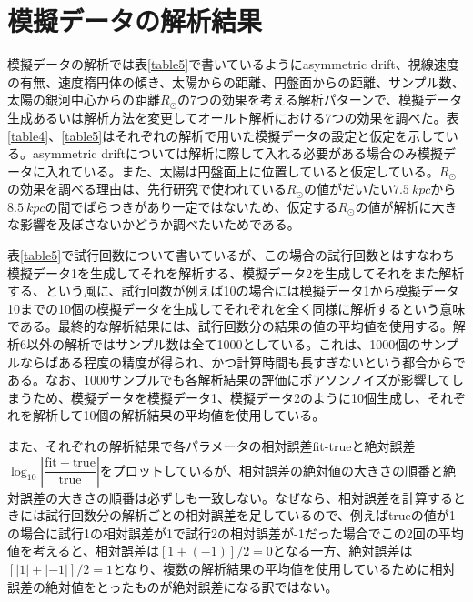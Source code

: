 \section{模擬データの解析結果 \label{模擬データの解析結果}}
模擬データの解析では表\ref{table5}で書いているようにasymmetric drift、視線速度の有無、速度楕円体の傾き、太陽からの距離、円盤面からの距離、サンプル数、太陽の銀河中心からの距離$R_{\odot}$の7つの効果を考える解析パターンで、模擬データ生成あるいは解析方法を変更してオールト解析における7つの効果を調べた。表\ref{table4}、\ref{table5}はそれぞれの解析で用いた模擬データの設定と仮定を示している。asymmetric driftについては解析に際して入れる必要がある場合のみ模擬データに入れている。また、太陽は円盤面上に位置していると仮定している。$R_{\odot}$の効果を調べる理由は、先行研究で使われている$R_{\odot}$の値がだいたい$\SI{7.5}{kpc}$から$\SI{8.5}{kpc}$の間でばらつきがあり一定ではないため、仮定する$R_{\odot}$の値が解析に大きな影響を及ぼさないかどうか調べたいためである。

表\ref{table5}で試行回数について書いているが、この場合の試行回数とはすなわち模擬データ1を生成してそれを解析する、模擬データ2を生成してそれをまた解析する、という風に、試行回数が例えば10の場合には模擬データ1から模擬データ10までの10個の模擬データを生成してそれぞれを全く同様に解析するという意味である。最終的な解析結果には、試行回数分の結果の値の平均値を使用する。解析6以外の解析ではサンプル数は全て1000としている。これは、1000個のサンプルならばある程度の精度が得られ、かつ計算時間も長すぎないという都合からである。なお、1000サンプルでも各解析結果の評価にポアソンノイズが影響してしまうため、模擬データを模擬データ1、模擬データ2のように10個生成し、それぞれを解析して10個の解析結果の平均値を使用している。

また、それぞれの解析結果で各パラメータの相対誤差fit-trueと絶対誤差$\log_{10}\left| \dfrac{\mathrm{fit} - \mathrm{true}}{\mathrm{true}}\right|$をプロットしているが、相対誤差の絶対値の大きさの順番と絶対誤差の大きさの順番は必ずしも一致しない。なぜなら、相対誤差を計算するときには試行回数分の解析ごとの相対誤差を足しているので、例えばtrueの値が1の場合に試行1の相対誤差が1で試行2の相対誤差が-1だった場合でこの2回の平均値を考えると、相対誤差は$[1+(-1)]/2=0$となる一方、絶対誤差は$[|1|+|-1|]/2=1$となり、複数の解析結果の平均値を使用しているために相対誤差の絶対値をとったものが絶対誤差になる訳ではない。


